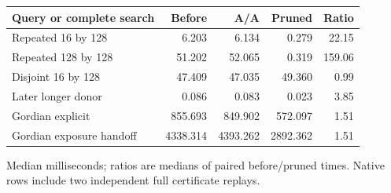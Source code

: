 \begin{center}\small
\begin{tabular}{@{}lrrrr@{}}
\toprule
Query or complete search & Before & A/A & Pruned & Ratio \\
\midrule
Repeated 16 by 128 & 6.203 & 6.134 & 0.279 & 22.15 \\
Repeated 128 by 128 & 51.202 & 52.065 & 0.319 & 159.06 \\
Disjoint 16 by 128 & 47.409 & 47.035 & 49.360 & 0.99 \\
Later longer donor & 0.086 & 0.083 & 0.023 & 3.85 \\
Gordian explicit & 855.693 & 849.902 & 572.097 & 1.51 \\
Gordian exposure handoff & 4338.314 & 4393.262 & 2892.362 & 1.51 \\
\bottomrule
\end{tabular}
\end{center}
Median milliseconds; ratios are medians of paired before/pruned times. Native rows include two independent full certificate replays.
